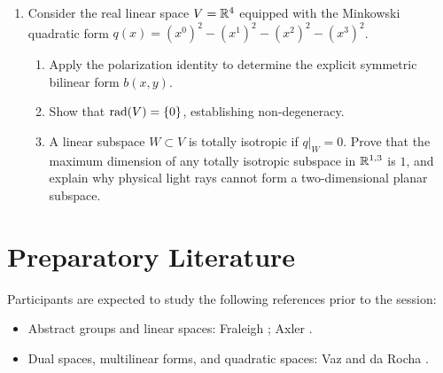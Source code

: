 \documentclass[11pt,a4paper]{article}
\begin{document}
\begin{enumerate}
  \item Consider the real linear space $V = \mathbb{R}^4$ equipped with the Minkowski
    quadratic form $q(x) = (x^0)^2 - (x^1)^2 - (x^2)^2 - (x^3)^2$.
    \begin{enumerate}
      \item Apply the polarization identity to determine the explicit
        symmetric bilinear form $b(x, y)$.
      \item Show that $\operatorname{rad}(V) = \{0\}$, establishing non-degeneracy.
      \item A linear subspace $W \subset V$ is totally isotropic if $q|_W = 0$.
        Prove that the maximum dimension of any totally isotropic subspace in
        $\mathbb{R}^{1,3}$ is $1$, and explain why physical light rays cannot form a
        two-dimensional planar subspace.
    \end{enumerate}
\end{enumerate}

\section{Preparatory Literature}
\label{sec:literature}

Participants are expected to study the following references prior to the
session:
\begin{itemize}
  \item Abstract groups and linear spaces: Fraleigh
    \cite[Chaps.~1.1, 1.2, and~7.33]{fraleighFirstCourseAbstract2021}; Axler
    \cite[Chaps.~1 and~2]{axlerLinearAlgebraDone2015}.
  \item Dual spaces, multilinear forms, and quadratic spaces: Vaz and da
    Rocha \cite[Chap.~1]{vazIntroductionCliffordAlgebras2016}.
\end{itemize}

\printbibliography[title={References}]
\end{document}
